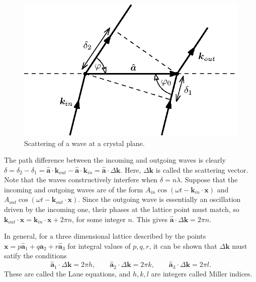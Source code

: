 \documentclass[11pt]{article}
\newcommand\bvec[1]{\boldsymbol{#1}}
\newcommand\kk{\bvec{k}}
\newcommand\x{\bvec{x}}
\newcommand\ahat{\bvec{\hat{a}}}
\begin{document}
        \begin{figure}[H]
        \centering
        \includegraphics[scale=1.0]{./laue.eps}
        \caption{Scattering of a wave at a crystal plane.}
        \label{fig:laue}
        \end{figure}

        The path difference between the incoming and outgoing waves is clearly $\delta = \delta_2 - \delta_1 = \ahat\cdot\kk_{out} - \ahat\cdot\kk_{in} 
        = \ahat\cdot\Delta\kk $. Here, $\Delta\kk$ is called the scattering vector.
        Note that the waves constructively interfere when $\delta = n\lambda$.
        Suppose that the incoming and outgoing waves are of the form $A_{in}\cos(\omega t - \kk_{in}\cdot \x)$ and 
        $A_{out}\cos(\omega t - \kk_{out}\cdot\x)$. Since the outgoing wave is essentially an oscillation driven by the incoming one,
        their phases at the lattice point must match, so $\kk_{out}\cdot\x = \kk_{in}\cdot\x + 2\pi n$, for some integer $n$.
        This gives $\ahat\cdot\Delta\kk = 2\pi n$.

        In general, for a three dimensional lattice described by the points $\x = p\ahat_1 + q\ahat_2 + r\ahat_3$ for integral values
        of $p, q, r$, it can be shown that $\Delta\kk$ must satify the conditions
        \[
                \ahat_1\cdot\Delta\kk = 2\pi h, \qquad \ahat_2\cdot\Delta\kk = 2\pi k, \qquad \ahat_3\cdot\Delta\kk = 2\pi l.
        \]
        These are called the Laue equations, and $h, k, l$ are integers called Miller indices.
        
\end{document}
